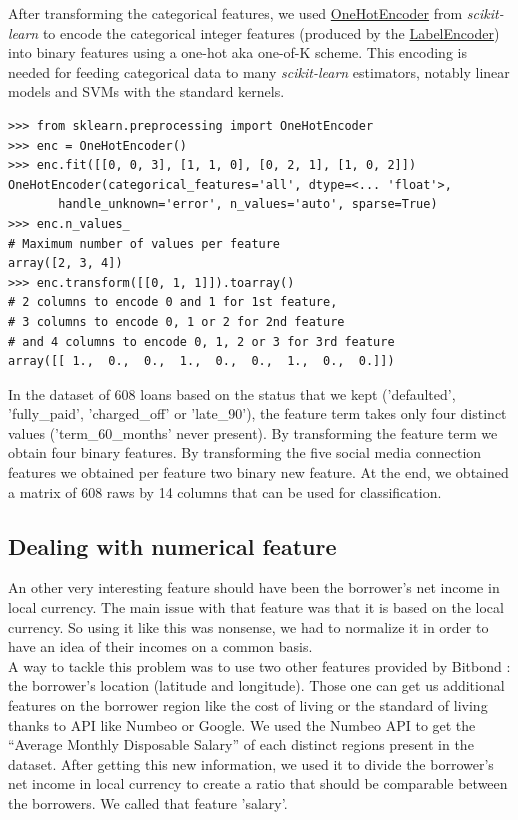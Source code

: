 		After transforming the categorical features, we used \href{http://scikit-learn.org/stable/modules/generated/sklearn.preprocessing.OneHotEncoder.html}{OneHotEncoder} from \textit{scikit-learn} to encode the categorical integer features (produced by the \href{http://scikit-learn.org/stable/modules/generated/sklearn.preprocessing.LabelEncoder.html}{LabelEncoder}) into binary features using a one-hot aka one-of-K scheme. This encoding is needed for feeding categorical data to many \textit{scikit-learn} estimators, notably linear models and SVMs with the standard kernels.
		\begin{verbatim}
>>> from sklearn.preprocessing import OneHotEncoder
>>> enc = OneHotEncoder()
>>> enc.fit([[0, 0, 3], [1, 1, 0], [0, 2, 1], [1, 0, 2]])
OneHotEncoder(categorical_features='all', dtype=<... 'float'>,
       handle_unknown='error', n_values='auto', sparse=True)
>>> enc.n_values_
# Maximum number of values per feature
array([2, 3, 4])
>>> enc.transform([[0, 1, 1]]).toarray()
# 2 columns to encode 0 and 1 for 1st feature,
# 3 columns to encode 0, 1 or 2 for 2nd feature
# and 4 columns to encode 0, 1, 2 or 3 for 3rd feature
array([[ 1.,  0.,  0.,  1.,  0.,  0.,  1.,  0.,  0.]])
		\end{verbatim}

		In the dataset of 608 loans based on the status that we kept ('defaulted', 'fully\_paid', 'charged\_off' or 'late\_90'), the feature term takes only four distinct values ('term\_60\_months' never present). By transforming the feature term we obtain four binary features. By transforming the five social media connection features we obtained per feature two binary new feature. At the end, we obtained a matrix of 608 raws by 14 columns that can be used for classification.

	\subsection{Dealing with numerical feature}
		An other very interesting feature should have been the borrower's net income in local currency. The main issue with that feature was that it is based on the local currency. So using it like this was nonsense, we had to normalize it in order to have an idea of their incomes on a common basis.\\

		A way to tackle this problem was to use two other features provided by Bitbond : the borrower's location (latitude and longitude). Those one can get us additional features on the borrower region like the cost of living or the standard of living thanks to API like Numbeo or Google. We used the Numbeo API to get the ``Average Monthly Disposable Salary'' of each distinct regions present in the dataset. After getting this new information, we used it to divide the borrower's net income in local currency to create a ratio that should be comparable between the borrowers. We called that feature 'salary'.\\

